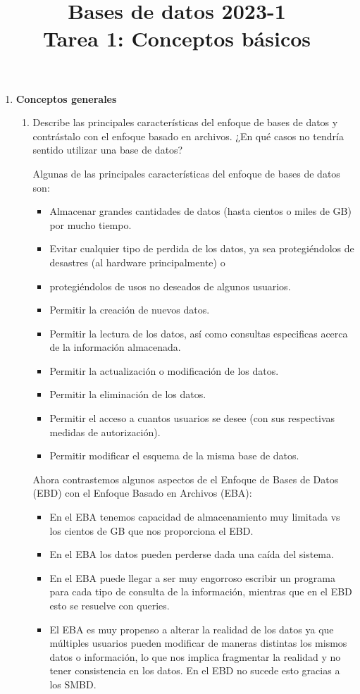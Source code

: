 \documentclass[12pt,a4paper]{article}
\title{Bases de datos 2023-1\\
Tarea 1: Conceptos básicos}
\begin{document}
\maketitle

\begin{enumerate}
	\item \textbf{Conceptos generales}
		\begin{enumerate}
			\item Describe las principales características del enfoque de bases de datos y contrástalo con el enfoque
				basado en archivos. ¿En qué casos no tendría sentido utilizar una base de datos?
				
				Algunas de las principales características del enfoque de bases de datos son:\\
				\begin{itemize}
					\item Almacenar grandes cantidades de datos (hasta cientos o miles de GB) por mucho tiempo.
					\item Evitar cualquier tipo de perdida de los datos, ya sea protegiéndolos de desastres (al hardware principalmente) o 
					\item protegiéndolos de usos no deseados de algunos usuarios.
					\item Permitir la creación de nuevos datos.
					\item Permitir la lectura de los datos, así como consultas especificas acerca de la información almacenada.
					\item Permitir la actualización o modificación de los datos.
					\item Permitir la eliminación de los datos.
					\item Permitir el acceso a cuantos usuarios se desee (con sus respectivas medidas de autorización).
					\item Permitir modificar el esquema de la misma base de datos.
				\end{itemize}

				Ahora contrastemos algunos aspectos de el Enfoque de Bases de Datos (EBD) con el Enfoque Basado en Archivos (EBA):
				\begin{itemize}
					\item En el EBA tenemos capacidad de almacenamiento muy limitada vs los cientos de GB que nos proporciona el EBD.
					\item En el EBA los datos pueden perderse dada una caída del sistema.
					\item En el EBA puede llegar a ser muy engorroso escribir un programa para cada tipo de consulta de la información, mientras
				 que en el EBD esto se resuelve con queries.
			 \item El EBA es muy propenso a alterar la realidad de los datos ya que múltiples usuarios
				 pueden modificar de maneras distintas los mismos datos o información, lo que nos implica
						fragmentar la realidad y no tener consistencia en los datos. En el EBD no sucede esto gracias a los SMBD.
				\end{itemize}


\end{enumerate}
\end{enumerate}
\end{document}
